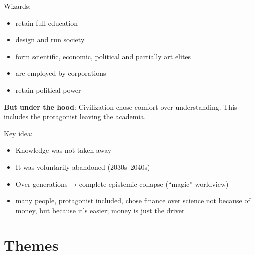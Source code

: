 \documentclass[12pt]{article}
\begin{document}
Wizards:
\begin{itemize}
  \item retain full education
  \item design and run society
  \item form scientific, economic, political and partially art elites
  \item are employed by corporations
  \item retain political power
\end{itemize}

\textbf{But under the hood}: Civilization chose comfort over understanding. This includes the protagonist leaving the academia.

Key idea:
\begin{itemize}
  \item Knowledge was not taken away
  \item It was voluntarily abandoned (2030s–2040s)
  \item Over generations → complete epistemic collapse (“magic” worldview)
  \item many people, protagonist included, chose finance over science not because of money, but because it’s easier; money is just the driver
\end{itemize}

\section{Themes}
\end{document}
